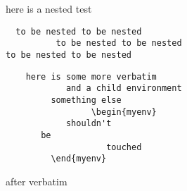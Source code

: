 here is a nested test
\begin{verbatim}
  to be nested to be nested
          to be nested to be nested
to be nested to be nested 
\end{verbatim}
\begin{lstlisting}
    here is some more verbatim
            and a child environment
         something else
                 \begin{myenv}
            shouldn't
       be
                    touched
         \end{myenv}
\end{lstlisting}
after verbatim
